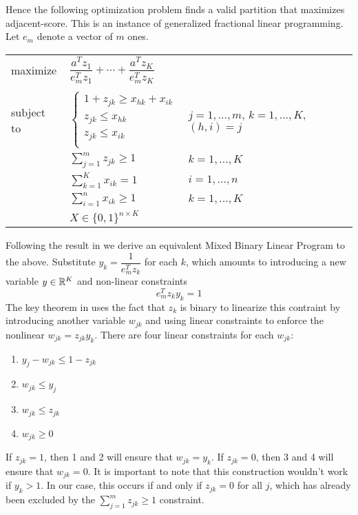 Hence the following optimization problem finds a valid partition that
maximizes adjacent-score. This is an instance of generalized fractional
linear programming. Let $e_m$ denote a vector of $m$ ones.

\bgroup
\def\arraystretch{1.5}
\begin{tabular}{l l l}
maximize   & $\dfrac{a^T z_1}{e_m^T z_1} + \cdots +
              \dfrac{a^T z_K}{e_m^T z_K}$
\\ \\
subject to 
           & $\begin{cases}
                 1 + z_{jk} \geq x_{hk} + x_{ik} \\
                 z_{jk} \leq x_{hk}             \\
                 z_{jk} \leq x_{ik}             \\
             \end{cases}$
           & $j = 1, ..., m$, $k = 1, ..., K$, $(h,i) = j$ \\
           & $\sum_{j=1}^m z_{jk} \geq 1$ & $k = 1, ..., K$ \\
           & $\sum_{k=1}^K x_{ik} = 1$ & $i = 1, ..., n$ \\
           & $\sum_{i=1}^n x_{ik} \geq 1$ & $k = 1, ..., K$ \\
           & $X \in \{0, 1\}^{n \times K}$
\end{tabular}
\egroup

Following the result in \cite{Li:94} we derive an equivalent Mixed
Binary Linear Program to the above.
Substitute $y_k = \dfrac{1}{e_m^T z_k}$ for each $k$, which amounts to
introducing a new variable $y \in \mathbb{R}^K$ and non-linear constraints
\[ e_m^T z_k y_k = 1 \]
The key theorem in \cite{Li:94} uses the fact that $z_k$ is binary to
linearize this contraint by introducing another variable $w_{jk}$ and
using linear constraints to enforce the nonlinear $w_{jk} = z_{jk} y_k$.
There are four linear constraints for each $w_{jk}$:

\begin{enumerate}
\item
$y_j - w_{jk} \leq 1 - z_{jk} $
\item
$w_{jk} \leq y_j$
\item
$w_{jk} \leq z_{jk}$
\item
$w_{jk} \geq 0$ 
\end{enumerate}

If $z_{jk} = 1$, then 1 and 2 will ensure that $w_{jk} = y_k$.
If $z_{jk} = 0$, then 3 and 4 will ensure that $w_{jk} = 0$.
It is important to note that this construction wouldn't work if
$y_k > 1$. In our case, this occurs if and only if $z_{jk} = 0$ for all
$j$, which has already been excluded by the $\sum_{j=1}^m z_{jk} \geq 1$
constraint.

